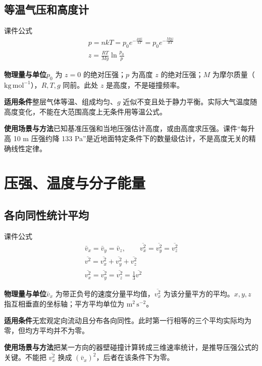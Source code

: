 \documentclass[UTF8,fontset=none,zihao=-4,a4paper]{ctexart}
\newcommand{\chapterpage}[1]{\clearpage\section{#1}}
\newcommand{\explain}[3]{\par\noindent\textbf{物理量与单位}\quad #1\par
\noindent\textbf{适用条件}\quad #2\par
\noindent\textbf{使用场景与方法}\quad #3\par}
\begin{document}
\par\noindent\begin{minipage}{\linewidth}
\subsection{等温气压和高度计}
\begin{infobox}[breakable=false]{课件公式}
\begin{gather*}p=nkT=p_0e^{-\frac{\mu gz}{kT}}=p_0e^{-\frac{Mgz}{RT}}\\z=\frac{RT}{Mg}\ln\frac{p_0}{p}\end{gather*}
\end{infobox}
\end{minipage}\par
\explain{$p_0$ 为 $z=0$ 的绝对压强；$p$ 为高度 $z$ 的绝对压强；$M$ 为摩尔质量（$\mathrm{kg\,mol^{-1}}$），$R,T,g$ 同前。此处 $z$ 是高度，不是碰撞频率。}{整层气体等温、组成均匀、$g$ 近似不变且处于静力平衡。实际大气温度随高度变化，不能在大范围高度上无条件用等温公式。}{已知基准压强和当地压强估计高度，或由高度求压强。课件“每升高 10 m 压强约降 133 Pa”是近地面特定条件下的数量级估计，不是高度无关的精确线性定律。}


\chapterpage{压强、温度与分子能量}
\par\noindent\begin{minipage}{\linewidth}
\subsection{各向同性统计平均}
\begin{infobox}[breakable=false]{课件公式}
\begin{gather*}\bar v_x=\bar v_y=\bar v_z,\qquad\overline{v_x^2}=\overline{v_y^2}=\overline{v_z^2}\\\overline{v^2}=\overline{v_x^2}+\overline{v_y^2}+\overline{v_z^2}\\\overline{v_x^2}=\overline{v_y^2}=\overline{v_z^2}=\frac13\overline{v^2}\end{gather*}
\end{infobox}
\end{minipage}\par
\explain{$\bar v_x$ 为带正负号的速度分量平均值，$\overline{v_x^2}$ 为该分量平方的平均。$x,y,z$ 指互相垂直的坐标轴；平方平均单位为 $\mathrm{m^2\,s^{-2}}$。}{无宏观定向流动且分布各向同性。此时第一行相等的三个平均实际均为零，但均方平均并不为零。}{把某一方向的器壁碰撞计算转成三维速率统计，是推导压强公式的关键。不能把 $\overline{v_x^2}$ 换成 $(\bar v_x)^2$，后者在该条件下为零。}
\end{document}

